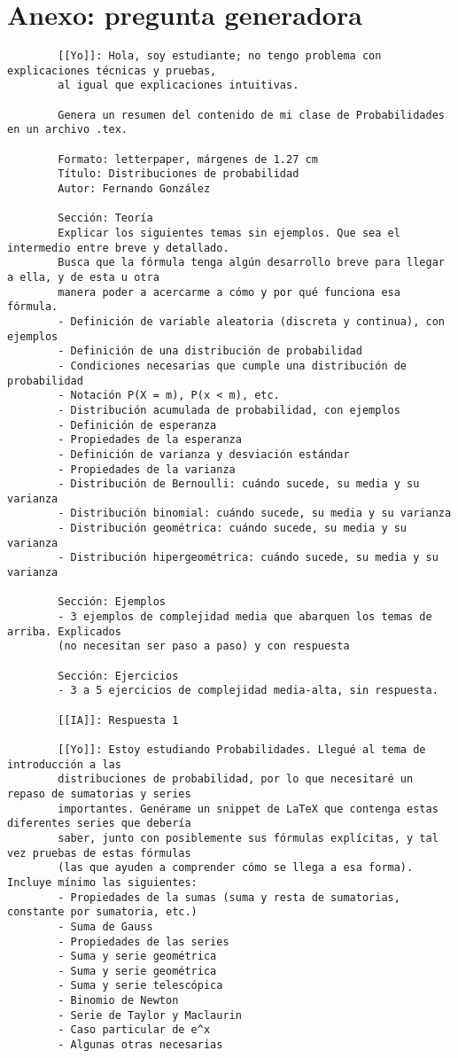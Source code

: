 \documentclass[letterpaper, 12pt]{article}
\begin{document}
	
	\section*{Anexo: pregunta generadora}
	\begin{verbatim}
		[[Yo]]: Hola, soy estudiante; no tengo problema con explicaciones técnicas y pruebas,
		al igual que explicaciones intuitivas.
		
		Genera un resumen del contenido de mi clase de Probabilidades en un archivo .tex.
		
		Formato: letterpaper, márgenes de 1.27 cm
		Título: Distribuciones de probabilidad
		Autor: Fernando González
		
		Sección: Teoría
		Explicar los siguientes temas sin ejemplos. Que sea el intermedio entre breve y detallado.
		Busca que la fórmula tenga algún desarrollo breve para llegar a ella, y de esta u otra
		manera poder a acercarme a cómo y por qué funciona esa fórmula.
		- Definición de variable aleatoria (discreta y continua), con ejemplos
		- Definición de una distribución de probabilidad
		- Condiciones necesarias que cumple una distribución de probabilidad
		- Notación P(X = m), P(x < m), etc.
		- Distribución acumulada de probabilidad, con ejemplos
		- Definición de esperanza
		- Propiedades de la esperanza
		- Definición de varianza y desviación estándar
		- Propiedades de la varianza
		- Distribución de Bernoulli: cuándo sucede, su media y su varianza
		- Distribución binomial: cuándo sucede, su media y su varianza
		- Distribución geométrica: cuándo sucede, su media y su varianza
		- Distribución hipergeométrica: cuándo sucede, su media y su varianza
		
		Sección: Ejemplos
		- 3 ejemplos de complejidad media que abarquen los temas de arriba. Explicados
		(no necesitan ser paso a paso) y con respuesta
		
		Sección: Ejercicios
		- 3 a 5 ejercicios de complejidad media-alta, sin respuesta.
		
		[[IA]]: Respuesta 1
		
		[[Yo]]: Estoy estudiando Probabilidades. Llegué al tema de introducción a las
		distribuciones de probabilidad, por lo que necesitaré un repaso de sumatorias y series
		importantes. Genérame un snippet de LaTeX que contenga estas diferentes series que debería
		saber, junto con posiblemente sus fórmulas explícitas, y tal vez pruebas de estas fórmulas
		(las que ayuden a comprender cómo se llega a esa forma). Incluye mínimo las siguientes:
		- Propiedades de la sumas (suma y resta de sumatorias, constante por sumatoria, etc.)
		- Suma de Gauss
		- Propiedades de las series
		- Suma y serie geométrica
		- Suma y serie geométrica
		- Suma y serie telescópica
		- Binomio de Newton
		- Serie de Taylor y Maclaurin
		- Caso particular de e^x
		- Algunas otras necesarias
		

\end{verbatim}
\end{document}

